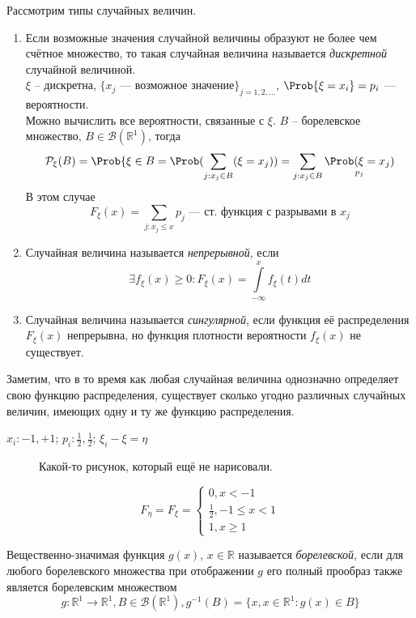 Рассмотрим типы случайных величин.
\begin{enumerate}
	\item Если возможные значения случайной величины образуют не более чем счётное множество, то такая случайная величина называется \textit{дискретной} случайной величиной. \\
	$\xi$ -- дискретна, $\{x_j \text{ --- возможное значение} \}_{j = 1, 2, \ldots}$, $\Prob \{ \xi = x_i \} = p_i$ --- вероятности. \\
	Можно вычислить все вероятности, связанные с $\xi$. $B$ -- борелевское множество, $B \in \mathcal{B} (\mathbb{R}^1)$, тогда
	\[
		\mathcal{P}_\xi (B) = \Prob \{ \xi \in B = \Prob (\sum\limits_{j : x_j \in B} (\xi = x_j)) = \sum\limits_{j : x_j \in B} \underset{p_j}{\Prob (\xi = x_j)}
	\]
	В этом случае
	\[
		F_\xi (x) = \sum\limits_{j : x_j \leqslant x} p_j \text{ --- ст. функция с разрывами в $x_j$}
	\]
	\item Случайная величина называется \textit{непрерывной}, если
	\[
		\exists f_\xi (x) \geqslant 0 : F_\xi (x) = \int\limits_{-\infty}^x f_\xi (t) dt
	\]
	\item Случайная величина называется \textit{сингулярной}, если функция её распределения $F_\xi (x)$ непрерывна, но функция плотности вероятности $f_\xi (x)$ не существует.
\end{enumerate}
Заметим, что в то время как любая случайная величина однозначно определяет свою функцию распределения, существует сколько угодно различных случайных величин, имеющих одну и ту же функцию распределения.
\begin{example} $x_i: -1, +1$; $p_i: \frac{1}{2}, \frac{1}{2}$; $\xi_i - \xi = \eta$
	\begin{figure}[ht] %
		\centering
		\def\svgwidth{16em}
		
		\caption{Какой-то рисунок, который ещё не нарисовали.}
	\end{figure}

	\[
		F_\eta = F_\xi =
		\begin{cases}
			0, x < -1 \\
			\frac{1}{2}, -1 \leqslant x < 1 \\
			1, x \geqslant 1
		\end{cases}
	\]
\end{example}
\begin{definition}
	Вещественно-значимая функция $g(x)$, $x \in \mathbb{R}$ называется \textit{борелевской}, если для любого борелевского множества при отображении $g$ его полный прообраз также является борелевским множеством
	\[
		g : \mathbb{R}^1 \rightarrow \mathbb{R}^1, B \in \mathcal{B} (\mathbb{R}^1), g^{-1} (B) = \{ x, x \in \mathbb{R}^1 : g(x) \in B \}
	\]
\end{definition}
